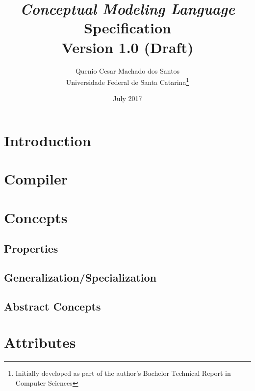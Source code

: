 \documentclass[a4paper,oneside,14pt, extrafontsizes]{memoir}
\title{\emph{Conceptual Modeling Language}\\Specification\\ \small{Version 1.0 (Draft)}}
\author{Quenio Cesar Machado dos Santos\\
\small{Universidade Federal de Santa Catarina}\thanks{
Initially developed as part of the author's Bachelor Technical Report in Computer Sciences}}
\date{July 2017}
\begin{document}
\begin{titlingpage}
\maketitle
\end{titlingpage}

\frontmatter

\begin{KeepFromToc}

\clearpage
\tableofcontents

\clearpage
\listoffigures

\clearpage
\listoftables

\end{KeepFromToc}

\mainmatter

\chapter{Introduction}


\chapter{Compiler}
\label{ch:compiler}


\chapter{Concepts}


\section{Properties}
\label{sec:properties}


\section{Generalization/Specialization}
\label{sec:generalization}


\section{Abstract Concepts}
\label{sec:abstract}

\chapter{Attributes}

\end{document}
